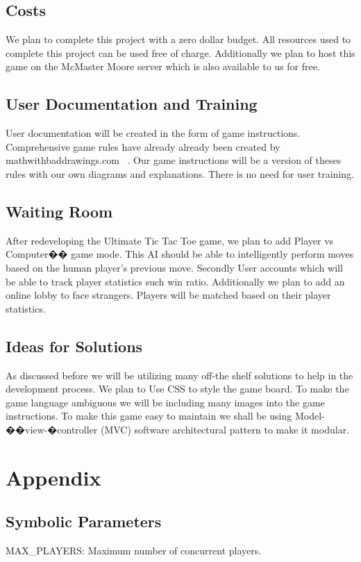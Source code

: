 \documentclass[12pt, titlepage]{article}
\newcounter{funreq}
\newcommand{\frthefunreq}{FR\thefunreq}
\begin{document}
\subsection{Costs}
We plan to complete this project with a zero dollar budget. All resources used
to complete this project can be used free of charge. Additionally we plan to
host this game on the McMaster Moore server which is also available to us for
free.

\subsection{User Documentation and Training}
User documentation will be created in the form of game instructions.
Comprehensive game rules have already already been created by
mathwithbaddrawings.com~\citep{Rules} . Our game instructions will be a version
of theses rules with our own diagrams and explanations. There is no need for
user training.


\subsection{Waiting Room}
After redeveloping the Ultimate Tic Tac Toe game, we plan to add Player vs
Computer�� game mode. This AI should be able to intelligently perform moves based
on the human player's previous move. Secondly User accounts which will be able
to track player statistics such win ratio. Additionally we plan to add an online
lobby to face strangers. Players will be matched based on their player
statistics.

\subsection{Ideas for Solutions}
As discussed before we will be utilizing many off-the shelf solutions to help in
the development process. We plan to Use CSS to style the game board. To make the
game language ambiguous we will be including many images into the game
instructions. To make this game easy to maintain we shall be using
Model-��view-�controller (MVC) software architectural pattern to make it
modular.





\newpage

\section{Appendix}

\subsection{Symbolic Parameters}
MAX\_PLAYERS: Maximum number of concurrent players.


\end{document}
